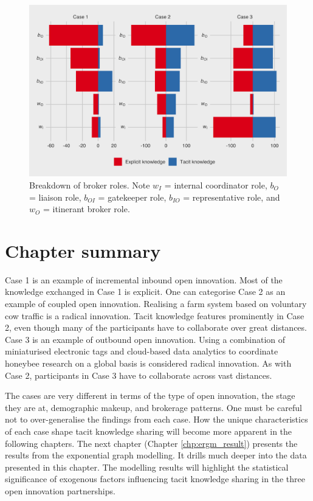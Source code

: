 \begin{figure}
\centering
\includegraphics[width = \linewidth]{Images/gf_brokerage.png}
\caption[Breakdown of broker roles]{Breakdown of \citet{gould1989structures} broker roles. Note $w_I$ = internal coordinator role, $b_O$ = liaison role, $b_{OI}$ = gatekeeper role, $b_{IO}$ = representative role, and $w_O$ = itinerant broker role.}
\label{fig:gf_brokerage}
\end{figure}

\section{Chapter summary}

Case 1 is an example of incremental inbound open innovation. Most of the knowledge exchanged in Case 1 is explicit. One can categorise Case 2 as an example of coupled open innovation. Realising a farm system based on voluntary cow traffic is a radical innovation. Tacit knowledge features prominently in Case 2, even though many of the participants have to collaborate over great distances. Case 3 is an example of outbound open innovation. Using a combination of miniaturised electronic tags and cloud-based data analytics to coordinate honeybee research on a global basis is considered radical innovation. As with Case 2, participants in Case 3 have to collaborate across vast distances. \medskip

The cases are very different in terms of the type of open innovation, the stage they are at, demographic makeup, and brokerage patterns. One must be careful not to over-generalise the findings from each case. How the unique characteristics of each case shape tacit knowledge sharing will become more apparent in the following chapters. The next chapter (Chapter \ref{chp:ergm_result}) presents the results from the exponential graph modelling. It drills much deeper into the data presented in this chapter. The modelling results will highlight the statistical significance of exogenous factors influencing tacit knowledge sharing in the three open innovation partnerships. 